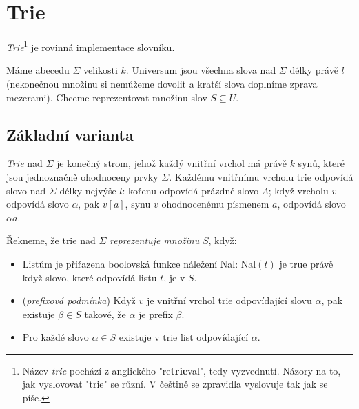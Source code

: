 
\chapter{Trie}

\emph{Trie}\footnote{Název \emph{trie} pochází z anglického 
"re{\bf trie}val", tedy vyzvednutí. Názory na to, jak vyslovovat 
"trie" se různí. V češtině se zpravidla vyslovuje tak jak se píše.} 
je rovinná implementace slovníku.

Máme abecedu $\Sigma$ velikosti $k$. Universum jsou všechna slova nad
$\Sigma$ délky právě $l$ (nekonečnou množinu si nemůžeme dovolit a
kratší slova doplníme zprava mezerami). Chceme reprezentovat množinu
slov $S \subseteq U$.



\section{Základní varianta}

\begin{defn}
\emph{Trie} nad $\Sigma$ je konečný strom, jehož každý vnitřní
vrchol má právě $k$ synů, které jsou jednoznačně ohodnoceny prvky $\Sigma$.
Každému vnitřnímu vrcholu trie odpovídá slovo nad $\Sigma$ délky
nejvýše $l$: kořenu
odpovídá prázdné slovo $\Lambda$; když vrcholu $v$ odpovídá slovo
$\alpha$, pak $v[a]$, synu $v$ ohodnocenému písmenem $a$, odpovídá
slovo $\alpha a$.
\end{defn}

\newcommand{\Nal}{\textrm{Nal}}
\begin{defn}
Řekneme, že trie nad $\Sigma$ \emph{reprezentuje množinu} $S$, když:
\begin{itemize}
  \item Listům je přiřazena boolovská funkce náležení \Nal: $\Nal(t)$ je
  	true právě když slovo, které odpovídá listu $t$, je v $S$.
  \item (\emph{prefixová podmínka}) Když $v$ je vnitřní vrchol trie 
	odpovídající slovu $\alpha$, pak
  	existuje $\beta \in S$ takové, že $\alpha$ je prefix $\beta$.
  \item Pro každé slovo $\alpha \in S$ existuje v trie list odpovídající
  	$\alpha$.
\end{itemize}
\end{defn}

